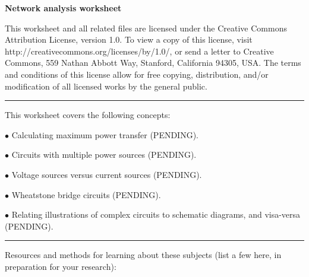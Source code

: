 
\centerline{\bf Network analysis worksheet} \bigskip 
 
This worksheet and all related files are licensed under the Creative Commons Attribution License, version 1.0.  To view a copy of this license, visit http://creativecommons.org/licenses/by/1.0/, or send a letter to Creative Commons, 559 Nathan Abbott Way, Stanford, California 94305, USA.  The terms and conditions of this license allow for free copying, distribution, and/or modification of all licensed works by the general public.

\bigskip 

\hrule

\vskip 5pt

This worksheet covers the following concepts:

\bigskip

\item {$\bullet$} Calculating maximum power transfer (PENDING).
\item {$\bullet$} Circuits with multiple power sources (PENDING).
\item {$\bullet$} Voltage sources versus current sources (PENDING).
\item {$\bullet$} Wheatstone bridge circuits (PENDING).
\item {$\bullet$} Relating illustrations of complex circuits to schematic diagrams, and visa-versa (PENDING).

\bigskip 

\hrule

\vskip 10pt

Resources and methods for learning about these subjects (list a few here, in preparation for your research):


